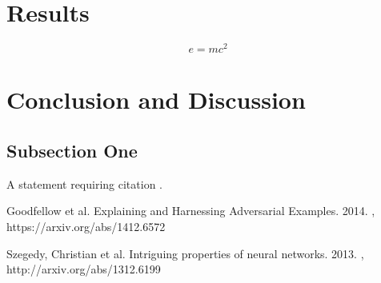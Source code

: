 \documentclass[twoside,twocolumn]{article}
\begin{document}
\section{Results}



\blindtext %

\begin{equation}
\label{eq:emc}
e = mc^2
\end{equation}

\blindtext %


\section{Conclusion and Discussion}

\subsection{Subsection One}

A statement requiring citation \cite{Figueredo:2009dg}.
\blindtext %


\begin{thebibliography}{99} %

Goodfellow et al.
\newblock Explaining and Harnessing Adversarial Examples. 2014.
, https://arxiv.org/abs/1412.6572

Szegedy, Christian et al.
\newblock Intriguing properties of neural networks. 2013.
, http://arxiv.org/abs/1312.6199
 

 
 
\end{thebibliography}

\end{document}
